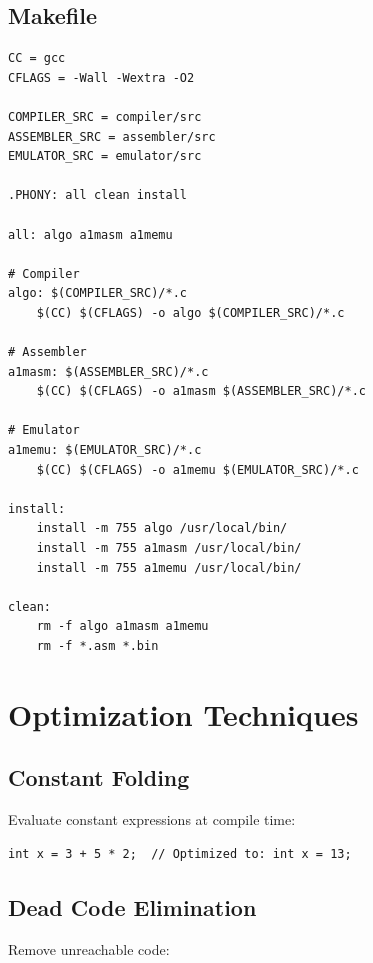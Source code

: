 \documentclass[12pt,a4paper,oneside]{book}
\begin{document}
\section{Makefile}

\begin{lstlisting}[caption={Makefile for A1M Projects}]
CC = gcc
CFLAGS = -Wall -Wextra -O2

COMPILER_SRC = compiler/src
ASSEMBLER_SRC = assembler/src
EMULATOR_SRC = emulator/src

.PHONY: all clean install

all: algo a1masm a1memu

# Compiler
algo: $(COMPILER_SRC)/*.c
	$(CC) $(CFLAGS) -o algo $(COMPILER_SRC)/*.c

# Assembler
a1masm: $(ASSEMBLER_SRC)/*.c
	$(CC) $(CFLAGS) -o a1masm $(ASSEMBLER_SRC)/*.c

# Emulator
a1memu: $(EMULATOR_SRC)/*.c
	$(CC) $(CFLAGS) -o a1memu $(EMULATOR_SRC)/*.c

install:
	install -m 755 algo /usr/local/bin/
	install -m 755 a1masm /usr/local/bin/
	install -m 755 a1memu /usr/local/bin/

clean:
	rm -f algo a1masm a1memu
	rm -f *.asm *.bin
\end{lstlisting}

\chapter{Optimization Techniques}

\section{Constant Folding}

Evaluate constant expressions at compile time:

\begin{lstlisting}[style=algo]
int x = 3 + 5 * 2;  // Optimized to: int x = 13;
\end{lstlisting}

\section{Dead Code Elimination}

Remove unreachable code:
\end{document}
